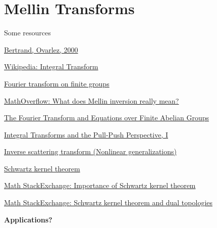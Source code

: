 \section*{Mellin Transforms}

\begin{sambox}{Some resources}{}

    \href{https://users.dimi.uniud.it/~giacomo.dellariccia/Glossary/transforms/Bertrand\%20J.Bertrand\%20P.Ovarle.2000.pdf}{Bertrand, Ovarlez, 2000}

    \href{https://en.wikipedia.org/wiki/Integral_transform}{Wikipedia: Integral Transform}

    \href{https://en.wikipedia.org/wiki/Fourier_transform_on_finite_groups}{Fourier transform on finite groups}

    \href{https://mathoverflow.net/questions/79868/what-does-mellin-inversion-really-mean}{MathOverflow: What does Mellin inversion really mean?}

    \href{https://people.cs.uchicago.edu/~laci/reu02/fourier.pdf}{The Fourier Transform and Equations over Finite Abelian Groups}

    \href{https://golem.ph.utexas.edu/category/2010/11/integral_transforms_and_pullpu.html}{Integral Transforms and the Pull-Push Perspective, I}

    \href{https://en.wikipedia.org/wiki/Inverse_scattering_transform}{Inverse scattering transform (Nonlinear generalizations)}

    \href{https://en.wikipedia.org/wiki/Schwartz_kernel_theorem}{Schwartz kernel theorem}

    \href{https://math.stackexchange.com/questions/501899/importance-of-schwartz-kernel-theorem}{Math StackExchange: Importance of Schwartz kernel theorem}

    \href{https://math.stackexchange.com/questions/2623515/schwartz-kernel-theorem-and-dual-topologies}{Math StackExchange: Schwartz kernel theorem and dual topologies}

    \vspace{.5em}

    \textbf{Applications?}


\end{sambox}

